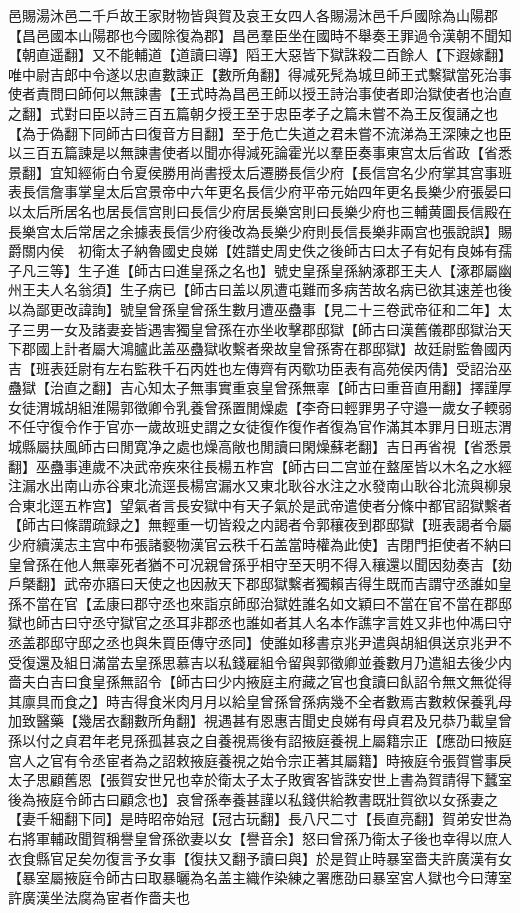邑賜湯沐邑二千戶故王家財物皆與賀及哀王女四人各賜湯沐邑千戶國除為山陽郡【昌邑國本山陽郡也今國除復為郡】昌邑羣臣坐在國時不舉奏王罪過令漢朝不聞知【朝直遥翻】又不能輔道【道讀曰導】䧟王大惡皆下獄誅殺二百餘人【下遐嫁翻】唯中尉吉郎中令遂以忠直數諫正【數所角翻】得减死髠為城旦師王式繫獄當死治事使者責問曰師何以無諫書【王式時為昌邑王師以授王詩治事使者即治獄使者也治直之翻】式對曰臣以詩三百五篇朝夕授王至于忠臣孝子之篇未嘗不為王反復誦之也【為于偽翻下同師古曰復音方目翻】至于危亡失道之君未嘗不流涕為王深陳之也臣以三百五篇諫是以無諫書使者以聞亦得減死論霍光以羣臣奏事東宫太后省政【省悉景翻】宜知經術白令夏侯勝用尚書授太后遷勝長信少府【長信宫名少府掌其宫事班表長信詹事掌皇太后宫景帝中六年更名長信少府平帝元始四年更名長樂少府張晏曰以太后所居名也居長信宫則曰長信少府居長樂宮則曰長樂少府也三輔黄圖長信殿在長樂宫太后常居之余據表長信少府後改為長樂少府則長信長樂非兩宫也張說誤】賜爵關内侯　初衛太子納魯國史良娣【姓譜史周史佚之後師古曰太子有妃有良姊有孺子凡三等】生子進【師古曰進皇孫之名也】號史皇孫皇孫納涿郡王夫人【涿郡屬幽州王夫人名翁須】生子病已【師古曰盖以夙遭屯難而多病苦故名病已欲其速差也後以為鄙更改諱詢】號皇曾孫皇曾孫生數月遭巫蠱事【見二十三卷武帝征和二年】太子三男一女及諸妻妾皆遇害獨皇曾孫在亦坐收擊郡邸獄【師古曰漢舊儀郡邸獄治天下郡國上計者屬大鴻臚此盖巫蠱獄收繫者衆故皇曾孫寄在郡邸獄】故廷尉監魯國丙吉【班表廷尉有左右監秩千石丙姓也左傳齊有丙歜功臣表有高苑侯丙倩】受詔治巫蠱獄【治直之翻】吉心知太子無事實重哀皇曾孫無辜【師古曰重音直用翻】擇謹厚女徒渭城胡組淮陽郭徵卿令乳養曾孫置閒燥處【李奇曰輕罪男子守邉一歲女子輭弱不任守復令作于官亦一歲故班史謂之女徒復作復作者復為官作滿其本罪月日班志渭城縣屬扶風師古曰閒寛净之處也燥高敞也閒讀曰閑燥蘇老翻】吉日再省視【省悉景翻】巫蠱事連歲不决武帝疾來往長楊五柞宫【師古曰二宫並在盩厔皆以木名之水經注漏水出南山赤谷東北流逕長楊宫漏水又東北耿谷水注之水發南山耿谷北流與柳泉合東北逕五柞宫】望氣者言長安獄中有天子氣於是武帝遣使者分條中都官詔獄繫者【師古曰條謂疏録之】無輕重一切皆殺之内謁者令郭穰夜到郡邸獄【班表謁者令屬少府續漢志主宫中布張諸褻物漢官云秩千石盖當時權為此使】吉閉門拒使者不納曰皇曾孫在他人無辜死者猶不可况親曾孫乎相守至天明不得入穰還以聞因劾奏吉【劾戶槩翻】武帝亦寤曰天使之也因赦天下郡邸獄繫者獨賴吉得生既而吉謂守丞誰如皇孫不當在官【孟康曰郡守丞也來詣京師邸治獄姓誰名如文穎曰不當在官不當在郡邸獄也師古曰守丞守獄官之丞耳非郡丞也誰如者其人名本作譙字言姓又非也仲馮曰守丞盖郡邸守邸之丞也與朱買臣傳守丞同】使誰如移書京兆尹遣與胡組俱送京兆尹不受復還及組日滿當去皇孫思慕吉以私錢雇組令留與郭徵卿並養數月乃遣組去後少内嗇夫白吉曰食皇孫無詔令【師古曰少内掖庭主府藏之官也食讀曰飤詔令無文無從得其廪具而食之】時吉得食米肉月月以給皇曾孫曾孫病幾不全者數焉吉數敕保養乳母加致醫藥【幾居衣翻數所角翻】視遇甚有恩惠吉聞史良娣有母貞君及兄恭乃載皇曾孫以付之貞君年老見孫孤甚哀之自養視焉後有詔掖庭養視上屬籍宗正【應劭曰掖庭宫人之官有令丞宦者為之詔敕掖庭養視之始令宗正著其屬籍】時掖庭令張賀嘗事戾太子思顧舊恩【張賀安世兄也幸於衛太子太子敗賓客皆誅安世上書為賀請得下蠶室後為掖庭令師古曰顧念也】哀曾孫奉養甚謹以私錢供給教書既壯賀欲以女孫妻之【妻千細翻下同】是時昭帝始冠【冠古玩翻】長八尺二寸【長直亮翻】賀弟安世為右將軍輔政聞賀稱譽皇曾孫欲妻以女【譽音余】怒曰曾孫乃衛太子後也幸得以庶人衣食縣官足矣勿復言予女事【復扶又翻予讀曰與】於是賀止時暴室嗇夫許廣漢有女【暴室屬掖庭令師古曰取暴曬為名盖主織作染練之署應劭曰暴室宮人獄也今曰薄室許廣漢坐法腐為宦者作嗇夫也